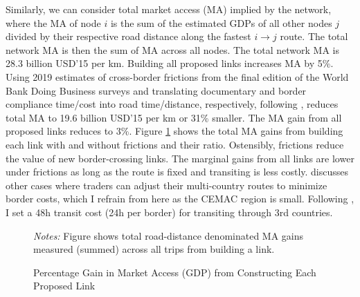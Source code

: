 \documentclass[a4paper]{article}
\begin{document}
Similarly, we can consider total market access (MA) implied by the network, where the MA of node $i$ is the sum of the estimated GDPs of all other nodes $j$ divided by their respective road distance along the fastest $i\to j$ route. The total network MA is then the sum of MA across all nodes. The total network MA is 28.3 billion USD'15 per km. Building all proposed links increases MA by 5\%. Using 2019 estimates of cross-border frictions from the final edition of the World Bank Doing Business surveys and translating documentary and border compliance time/cost into road time/distance, respectively, following \citet{krantz2024optimal}, reduces total MA to 19.6 billion USD'15 per km or 31\% smaller. The MA gain from all proposed links reduces to 3\%. Figure \ref{fig:MA_DA_TAN} shows the total MA gains from building each link with and without frictions and their ratio. Ostensibly, frictions reduce the value of new border-crossing links. The marginal gains from all links are lower under frictions as long as the route is fixed and transiting is less costly. \citet{krantz2024optimal} discusses other cases where traders can adjust their multi-country routes to minimize border costs, which I refrain from here as the CEMAC region is small. Following \citet{krantz2024optimal}, I set a 48h transit cost (24h per border) for transiting through 3rd countries. %


\begin{figure}[H]  \vspace{-1mm}
\centering
\caption{\label{fig:MA_DA_TAN} Percentage Gain in Market Access (GDP) from Constructing Each Proposed Link}
\vspace{2mm}
\scriptsize 
\emph{Notes:} Figure shows total road-distance denominated MA gains measured (summed) across all trips from building a link. 
\end{figure}
\end{document}
